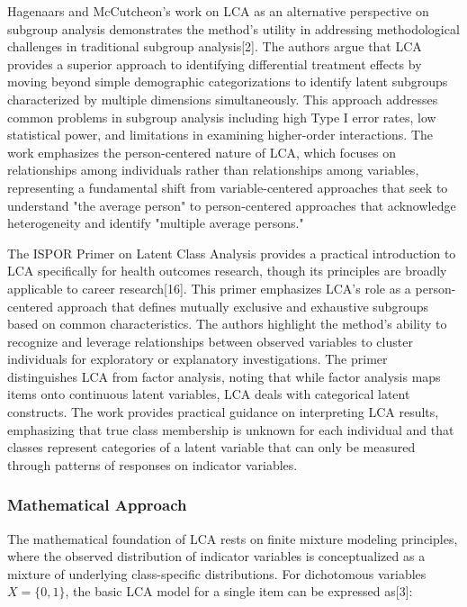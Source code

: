 \documentclass[main.tex]{subfiles}
\begin{document}
Hagenaars and McCutcheon's work on LCA as an alternative perspective on subgroup analysis demonstrates the method's utility in addressing methodological challenges in traditional subgroup analysis[2]. The authors argue that LCA provides a superior approach to identifying differential treatment effects by moving beyond simple demographic categorizations to identify latent subgroups characterized by multiple dimensions simultaneously. This approach addresses common problems in subgroup analysis including high Type I error rates, low statistical power, and limitations in examining higher-order interactions. The work emphasizes the person-centered nature of LCA, which focuses on relationships among individuals rather than relationships among variables, representing a fundamental shift from variable-centered approaches that seek to understand "the average person" to person-centered approaches that acknowledge heterogeneity and identify "multiple average persons."

The ISPOR Primer on Latent Class Analysis provides a practical introduction to LCA specifically for health outcomes research, though its principles are broadly applicable to career research[16]. This primer emphasizes LCA's role as a person-centered approach that defines mutually exclusive and exhaustive subgroups based on common characteristics. The authors highlight the method's ability to recognize and leverage relationships between observed variables to cluster individuals for exploratory or explanatory investigations. The primer distinguishes LCA from factor analysis, noting that while factor analysis maps items onto continuous latent variables, LCA deals with categorical latent constructs. The work provides practical guidance on interpreting LCA results, emphasizing that true class membership is unknown for each individual and that classes represent categories of a latent variable that can only be measured through patterns of responses on indicator variables.

\subsubsection{Mathematical Approach}

The mathematical foundation of LCA rests on finite mixture modeling principles, where the observed distribution of indicator variables is conceptualized as a mixture of underlying class-specific distributions. For dichotomous variables $X = \{0,1\}$, the basic LCA model for a single item can be expressed as[3]:
\end{document}
